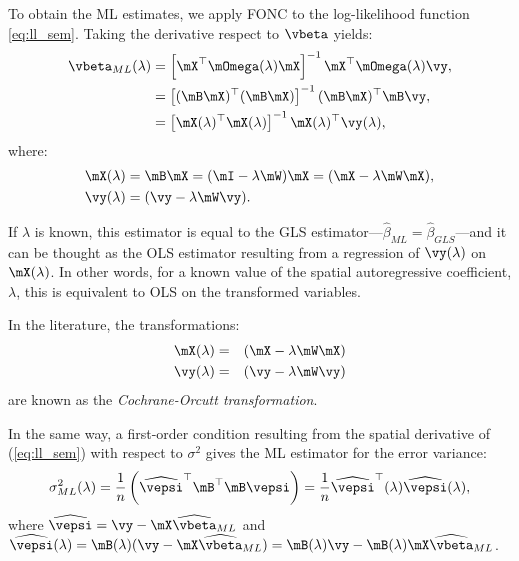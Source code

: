 \documentclass[english,12pt]{book}\usepackage[]{graphicx}\usepackage[]{xcolor}
\begin{document}
To obtain the ML estimates, we apply FONC to the log-likelihood function \eqref{eq:ll_sem}. Taking the derivative respect to $\vbeta$ yields:
\begin{equation}\label{eq:beta_gls_ml}
  \begin{aligned}
\vbeta_{ML}(\lambda) & =\left[\mX^\top\mOmega(\lambda)\mX\right]^{-1}\mX^\top\mOmega(\lambda)\vy,\\
                     & = \left[(\mB\mX)^\top (\mB \mX)\right]^{-1} (\mB\mX)^\top \mB \vy, \\
                     & = \left[\mX(\lambda)^\top  \mX(\lambda)\right]^{-1} \mX(\lambda)^\top \vy(\lambda),
  \end{aligned}
\end{equation}
%
where:
\begin{equation}
  \begin{aligned}
\mX(\lambda) & = \mB\mX = (\mI - \lambda\mW)\mX = (\mX - \lambda\mW\mX), \\
\vy(\lambda) & = (\vy - \lambda \mW \vy).
  \end{aligned}
\end{equation}

If $\lambda$ is known, this estimator is equal to the GLS estimator---$\widehat{\beta}_{ML} = \widehat{\beta}_{GLS}$---and it can be thought as the OLS estimator resulting from a regression of $\vy(\lambda)$ on $\mX(\lambda)$. In other words, for a known value of the spatial autoregressive coefficient, $\lambda$, this is equivalent to OLS on the transformed variables.

\begin{remark}
In the literature, the transformations:
\begin{eqnarray*}
\mX(\lambda) &=&(\mX - \lambda\mW\mX) \\
\vy(\lambda) &=& (\vy - \lambda \mW \vy)
\end{eqnarray*}
%
are known as the \emph{Cochrane-Orcutt transformation}.
\end{remark}

In the same way, a first-order condition resulting from the spatial derivative of (\ref{eq:ll_sem}) with respect to $\sigma^2$ gives the ML estimator for the error variance:
\begin{equation}
	\sigma^2_{ML}(\lambda) = \frac{1}{n}\left(\widehat{\vepsi}^\top\mB^\top\mB \vepsi\right)= \frac{1}{n}\widehat{\vepsi}^\top(\lambda)\widehat{\vepsi}(\lambda),
\end{equation}
%
where $\widehat{\vepsi} = \vy - \mX\widehat{\vbeta}_{ML}$ and $\widehat{\vepsi}(\lambda) = \mB(\lambda)(\vy - \mX\widehat{\vbeta}_{ML}) = \mB(\lambda)\vy - \mB(\lambda)\mX\widehat{\vbeta}_{ML}$. 
\end{document}
